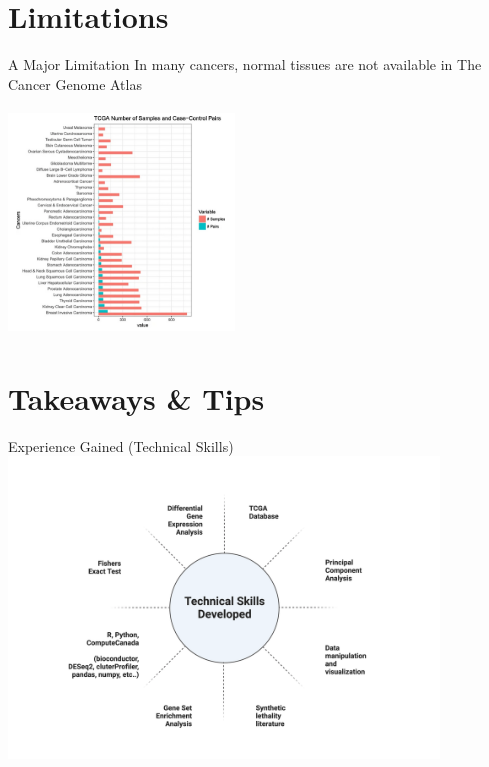 \documentclass{beamer}
\begin{document}
	\section{Limitations}
	\begin{frame}{A Major Limitation}
		In many cancers, normal tissues are not available in The Cancer Genome Atlas	
		\begin{center}
			\includegraphics[width=6cm, height=6cm]{lack.png}
		\end{center}
	\end{frame}

	\section{Takeaways \& Tips}
	\begin{frame}{Experience Gained (Technical Skills)}
		\includegraphics[width=\textwidth,height=8cm]{technical_skills_gained.png}
	\end{frame}
\end{document}
